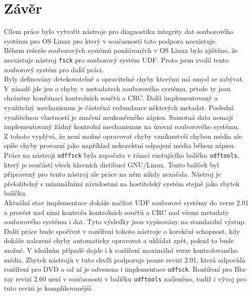 \chapter{Závěr}
Cílem práce bylo vytvořit nástroje pro diagnostiku integrity dat souborového systému pro OS Linux pro který v současnosti tato podpora neexistuje.\\
Během rešerše souborových systémů použávaných v OS Linux bylo zjištěno, že neexistuje nástroj \texttt{fsck} pro souborový systém UDF. Proto jsem zvolil tento souborový systém pro další práci.\\
Byly definovány detekovatelné a opravitelné chyby kterými má smysl se zabývat. V zásadě jde jen o chyby v metadatech souborového systému, prtože ty jsou chráněny kombinací kontrolních součtů a CRC. Další implementovaný a využitelný mechanismus je částečná redundance některých metadat. Poslední využitelnou vlastností je značení neukončeného zápisu. Samotná data nemají implementovaný žádný kontrolní mechanismus na úrovni souborového systému.\\
Z tohoto vyplývá, že není možné opravovat chyby vzniknutvší chybou média ale spíše chyby provozní jako například nekorektní odpojení média během zápisu.\\
Práce na nástroji \texttt{udffsck} byla započata v rámci exstujícího balíčku \texttt{udftools}, který je součástí všech hlavních distibucí GNU/Linux. Tento balíček byl připravený pro tento nástroj ale práce na něm nikdy nezačala. Nástroj je přeložitelný s minimálními závislostmi na hostitelský systém stejně jako zbytek balíčku.\\
Aktuální stav implementace dokáže načítat UDF souborové systémy do verze 2.01 a provést nad nimi kontrolu kontrolních součtů a CRC nad všemi metadaty souborového systému i dat. Tyto výsledky jsou vypisovány na standardní výstup.\\
Další práce bude spočívat v rozšíření tohoto nástroje o korekční schopnost, kdy dokáže nalezené chyby automaticky opravovat a ukládat zpět, pokud to bude možné. V ideálním případě dojde i k rozšíření maximální verze kontrolovaného média. Zbytek nástrojů v tuto chvíli podporuje pouze revizi 2.01, která odpovídá rozšíření pro DVD a od ní je odvezena i implementace \texttt{udfsck}. Rozšíření pro Blu-ray revizí 2.60 není v současnosti v balíčku \texttt{udftools} začleněno, tudíž i vývoj pro tuto revizi je komplikovanější. 
